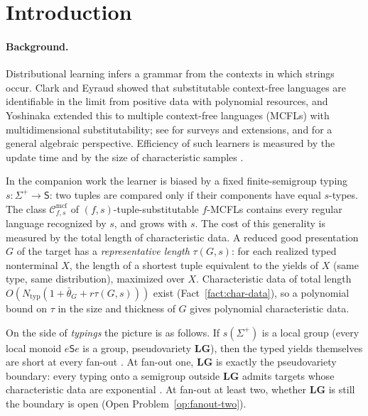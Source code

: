 \documentclass[11pt]{article}
\numberwithin{equation}{section}
\theoremstyle{plain}
\theoremstyle{definition}
\theoremstyle{remark}
\theoremstyle{plain}
\newcommand{\Cmcf}[2]{\mathcal{C}^{\mathrm{mcf}}_{#1,#2}}
\newcommand{\LG}{\mathbf{LG}}
\newcommand{\bth}{\bar\theta}
\begin{document}
\tableofcontents

\section{Introduction}
\label{sec:intro}

\paragraph{Background.}
Distributional learning infers a grammar from the contexts in which strings
occur.  Clark and Eyraud \cite{ClarkEyraud2007} showed that substitutable
context-free languages are identifiable in the limit from positive data with
polynomial resources, and Yoshinaka \cite{Yoshinaka2011} extended this to
multiple context-free languages (MCFLs) \cite{SekiEtAl1991} with
multidimensional substitutability; see \cite{ClarkYoshinaka2014,ClarkYoshinaka2016}
for surveys and extensions, and \cite{Yoshinaka2015General} for a general
algebraic perspective.  Efficiency of such learners is measured by the update
time and by the size of characteristic samples
\cite{deLaHiguera1997,EyraudHeinzYoshinaka2016}.

In the companion work \cite{KuriyamaTCS1,KuriyamaMCFGpreprint,KuriyamaCompendium}
the learner is biased by a fixed finite-semigroup typing
$s:\Sigma^+\to\mathsf S$: two tuples are compared only if their components have
equal $s$-types.  The class $\Cmcf{f}{s}$ of $(f,s)$-tuple-substitutable
$f$-MCFLs contains every regular language recognized by $s$, and grows with
$s$.  The cost of this generality is measured by the total length of
characteristic data.  A reduced good presentation $G$ of the target has a
\emph{representative length} $\tau(G,s)$: for each realized typed nonterminal
$X$, the length of a shortest tuple equivalent to the yields of $X$ (same type,
same distribution), maximized over $X$.  Characteristic data of total length
$O(N_{\mathrm{typ}}(1+\bth_G+r\tau(G,s)))$ exist (Fact~\ref{fact:char-data}),
so a polynomial bound on $\tau$ in the size and thickness of $G$ gives
polynomial characteristic data.

On the side of \emph{typings} the picture is as follows.  If $s(\Sigma^+)$ is a
local group (every local monoid $e\mathsf Se$ is a group, pseudovariety
$\LG$), then the typed yields themselves are short at every fan-out
\cite{KuriyamaCompendium}.  At fan-out one, $\LG$ is exactly the pseudovariety
boundary: every typing onto a semigroup outside $\LG$ admits targets whose
characteristic data are exponential \cite{KuriyamaTCS1,KuriyamaTypingClass}.
At fan-out at least two, whether $\LG$ is still the boundary is open
(Open Problem~\ref{op:fanout-two}).
\end{document}
